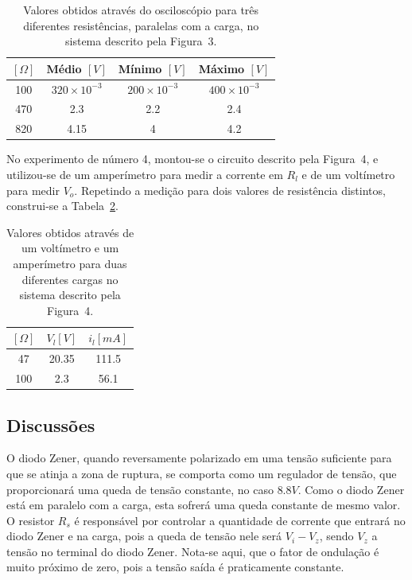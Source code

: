 \documentclass[12pt,a4paper]{article}
\begin{document}
\begin{table}[htpb]
  \centering
  \caption{Valores obtidos através do osciloscópio para três diferentes resistências, paralelas com a carga, no sistema descrito pela Figura~3.}
  \label{exp3}
  \begin{tabular}{c c c c}
    \toprule
    $[\Omega]$ & Médio $[V]$ & Mínimo $[V]$  &  Máximo $[V]$\\ \midrule
   100  & $320 \times 10^{-3}$ & $200 \times 10^{-3}$& $400 \times 10^{-3}$ \\\midrule
   470& 2.3& 2.2& 2.4 \\\midrule
   820& 4.15& 4& 4.2 \\ \bottomrule 
  \end{tabular}
\end{table}

No experimento de número 4, montou-se o circuito descrito pela Figura~4, e utilizou-se de um amperímetro para medir a corrente em $R_l$ e de um voltímetro para medir $V_o$. Repetindo a medição para dois valores de resistência distintos, construi-se a Tabela~\ref{exp4}. 
\begin{table}[htpb]
  \centering
  \caption{Valores obtidos através de um voltímetro e um amperímetro para duas diferentes cargas no sistema descrito pela Figura~4.}
  \label{exp4}
  \begin{tabular}{c c c }
    \toprule
    $[\Omega]$ & $V_{l} [V]$&$i_l [mA]$  \\ \midrule
   47& 20.35& 111.5 \\\midrule
   100& 2.3& 56.1 \\\midrule
  \end{tabular}
\end{table}

\newpage
\subsection{Discussões}
O diodo Zener, quando reversamente polarizado em uma tensão suficiente para que se atinja a zona de ruptura,  se comporta como um regulador de tensão, que proporcionará uma queda de tensão constante, no caso $8.8 V$. Como o diodo Zener está em paralelo com a carga, esta sofrerá uma queda constante de mesmo valor. O resistor $R_s$ é responsável por controlar a quantidade de corrente que entrará no diodo Zener e na carga, pois a queda de tensão nele será $V_{i}-V_{z}$, sendo $V_{z}$ a tensão no terminal do diodo Zener. Nota-se aqui, que o fator de ondulação é muito próximo de zero, pois a tensão saída é praticamente constante.
\end{document}
